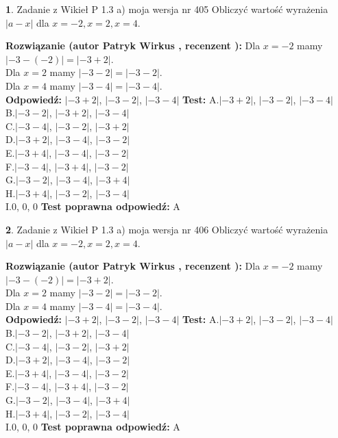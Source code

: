 \documentclass[12pt, a4paper]{article}
\theoremstyle{definition} %
\newtheorem{zad}{}
\newcommand{\zadStart}[1]{\begin{zad}#1\newline}
\newcommand{\zadStop}{\end{zad}}
\newcommand{\rozwStart}[2]{\noindent \textbf{Rozwiązanie (autor #1 , recenzent #2): }\newline}
\newcommand{\rozwStop}{\newline}
\newcommand{\odpStart}{\noindent \textbf{Odpowiedź:}\newline}
\newcommand{\odpStop}{\newline}
\newcommand{\testStart}{\noindent \textbf{Test:}\newline}
\newcommand{\testStop}{\newline}
\newcommand{\kluczStart}{\noindent \textbf{Test poprawna odpowiedź:}\newline}
\newcommand{\kluczStop}{\newline}
\begin{document}
\zadStart{Zadanie z Wikieł P 1.3 a) moja wersja nr 405}
Obliczyć wartość wyrażenia $|a - x|$ dla $x=-2,x=2,x=4$.
\zadStop
\rozwStart{Patryk Wirkus}{}
Dla $x = -2$ mamy $|-3 - (-2)| = |-3 + 2|$.\\
Dla $x = 2$ mamy $|-3 - 2| = |-3 - 2|$.\\
Dla $x = 4$ mamy $|-3 - 4| = |-3 - 4|$.\\
\rozwStop
\odpStart
$|-3 + 2|$, $|-3 - 2|$, $|-3 - 4|$
\odpStop
\testStart
A.$|-3 + 2|$, $|-3 - 2|$, $|-3 - 4|$\\
B.$|-3 - 2|$, $|-3 + 2|$, $|-3 - 4|$\\
C.$|-3 - 4|$, $|-3 - 2|$, $|-3 + 2|$\\
D.$|-3 + 2|$, $|-3 - 4|$, $|-3 - 2|$\\
E.$|-3 + 4|$, $|-3 - 4|$, $|-3 - 2|$\\
F.$|-3 - 4|$, $|-3 + 4|$, $|-3 - 2|$\\
G.$|-3 - 2|$, $|-3 - 4|$, $|-3 + 4|$\\
H.$|-3 + 4|$, $|-3 - 2|$, $|-3 - 4|$\\
I.$0$, $0$, $0$
\testStop
\kluczStart
A
\kluczStop



\zadStart{Zadanie z Wikieł P 1.3 a) moja wersja nr 406}
Obliczyć wartość wyrażenia $|a - x|$ dla $x=-2,x=2,x=4$.
\zadStop
\rozwStart{Patryk Wirkus}{}
Dla $x = -2$ mamy $|-3 - (-2)| = |-3 + 2|$.\\
Dla $x = 2$ mamy $|-3 - 2| = |-3 - 2|$.\\
Dla $x = 4$ mamy $|-3 - 4| = |-3 - 4|$.\\
\rozwStop
\odpStart
$|-3 + 2|$, $|-3 - 2|$, $|-3 - 4|$
\odpStop
\testStart
A.$|-3 + 2|$, $|-3 - 2|$, $|-3 - 4|$\\
B.$|-3 - 2|$, $|-3 + 2|$, $|-3 - 4|$\\
C.$|-3 - 4|$, $|-3 - 2|$, $|-3 + 2|$\\
D.$|-3 + 2|$, $|-3 - 4|$, $|-3 - 2|$\\
E.$|-3 + 4|$, $|-3 - 4|$, $|-3 - 2|$\\
F.$|-3 - 4|$, $|-3 + 4|$, $|-3 - 2|$\\
G.$|-3 - 2|$, $|-3 - 4|$, $|-3 + 4|$\\
H.$|-3 + 4|$, $|-3 - 2|$, $|-3 - 4|$\\
I.$0$, $0$, $0$
\testStop
\kluczStart
A
\kluczStop
\end{document}
